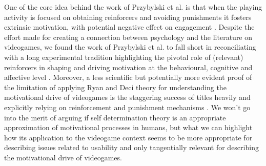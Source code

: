One of the core idea behind the work of Przybylski et al. is that when the playing activity is focused on obtaining reinforcers and avoiding punishments it fosters extrinsic motivation, with potential negative effect on engagement \cite{przybylski2010motivational}.  Despite the effort made for creating a connection between psychology and the literature on videogames, we found the work of Przybylski et al. to fall short in reconciliating with a long experimental tradition highlighting the pivotal role of (relevant) reinforcers in shaping and driving motivation at the behavioural, cognitive and affective level \cite{skinner1953science,schultz1997neural,berridge2004motivation}. Moreover, a less scientific but potentially more evident proof of the limitation of applying Ryan and Deci theory for understanding the motivational drive of videogames is the staggering success of titles heavily and explicitly relying on reinforcement and punishment mechanisms \cite{darksouls,candyc}. We won’t go into the merit of arguing if self determination theory is an appropriate approximation of motivational processes in humans, but what we can highlight how its application to the videogame context seems to be more appropriate for describing issues related to usability and only tangentially relevant for describing the motivational drive of videogames.\\
\\
